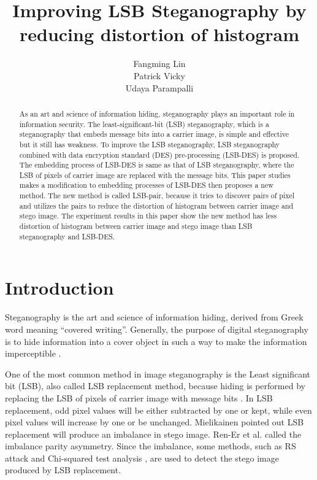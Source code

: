 \documentclass[a4paper,10pt,twocolumn]{article}
\title{Improving LSB Steganography by reducing distortion of histogram}
\author{Fangming Lin \\ Patrick Vicky \\ Udaya Parampalli}
\begin{document}
\maketitle

\begin{abstract}
As an art and science of information hiding, steganography plays an important
role in information security. The least-significant-bit (LSB) steganography,
which is a steganography that embeds message bits into a carrier image, is
simple and effective but it still has weakness. To improve the LSB
steganography, LSB steganography combined with data encryption standard
(DES) pre-processing (LSB-DES) is proposed. The embedding process of
LSB-DES is same as that of LSB steganography, where the LSB of pixels of
carrier image are replaced with the message bits. This paper studies makes a
modification to embedding processes of LSB-DES then proposes a new
method. The new method is called LSB-pair, because it tries to discover pairs
of pixel and utilizes the pairs to reduce the distortion of histogram between
carrier image and stego image. The experiment results in this paper show the
new method has less distortion of histogram between carrier image and stego
image than LSB steganography and LSB-DES.

\end{abstract}

\section{Introduction}

Steganography is the art and science of information hiding, 
derived from Greek word meaning ``covered writing''.
Generally, the purpose of digital steganography is to hide
information into a cover object in such a way to make the information imperceptible \cite{c1}.

One of the most common method in image steganography is the Least significant bit (LSB),
also called LSB replacement method, because hiding is performed by replacing the LSB
of pixels of carrier image with message bits \cite{c2}. In LSB replacement, odd pixel values will
be either subtracted by one or kept, while even pixel values will increase by
one or be unchanged. Mielikainen \cite{c2} pointed out LSB replacement will
produce an imbalance in stego image. Ren-Er et al. \cite{c3} called the imbalance
parity asymmetry. Since the imbalance, some methods, such as RS attack \cite{c4}
and Chi-squared test analysis \cite{5}, are used to detect the stego image
produced by LSB replacement.
\end{document}

